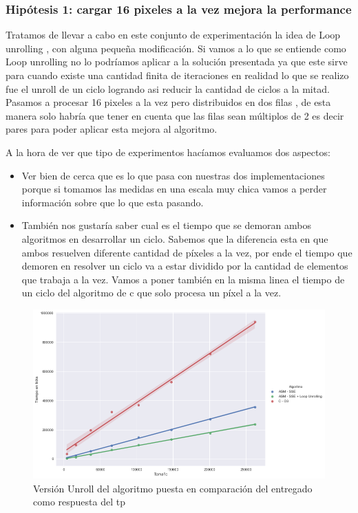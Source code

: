 \subsubsection*{Hipótesis 1: cargar 16 pixeles a la vez mejora la performance}
Tratamos de llevar a cabo en este conjunto de experimentación la idea de Loop unrolling , con alguna pequeña modificación. Si vamos a lo que se entiende como Loop unrolling no lo podríamos aplicar a la solución presentada ya que este sirve para cuando existe una cantidad finita de iteraciones en realidad lo que se realizo fue el unroll de un ciclo logrando asi reducir la cantidad de ciclos a la mitad. Pasamos a procesar 16 pixeles a la vez pero distribuidos en dos filas , de esta manera solo habría que tener en cuenta que las filas sean múltiplos de 2 es decir pares para poder aplicar esta mejora al algoritmo.

A la hora de ver que tipo de experimentos hacíamos evaluamos dos aspectos:
\begin{itemize}
\item Ver bien de cerca que es lo que pasa con nuestras dos implementaciones porque si tomamos las medidas en una escala muy chica vamos a perder información sobre que lo que esta pasando. 

\item También nos gustaría saber cual es el tiempo que se demoran ambos algoritmos en desarrollar un ciclo. Sabemos que la diferencia esta en que ambos resuelven diferente cantidad de  píxeles a la vez, por ende el tiempo que demoren en resolver un ciclo va a estar dividido por la cantidad de elementos que trabaja a la vez. Vamos a poner también en la misma linea el tiempo de un ciclo del algoritmo de c que solo procesa un píxel a la vez.
\end{itemize}
\begin{figure}[H]
	\centering
	\includegraphics[scale=0.5]{img/fourCombine_UnrollvsNormal.png}
	\caption{Versión Unroll del algoritmo puesta en comparación del entregado como respuesta del tp}
	\label{fourCombine_unroolvsnormal}
\end{figure}

